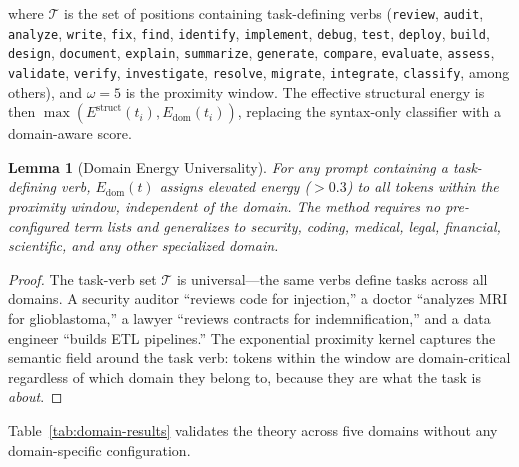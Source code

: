 \documentclass[11pt]{article}
\newtheorem{lemma}[theorem]{Lemma}
\theoremstyle{remark}
\newcommand{\Er}{E^{\text{struct}}}
\begin{document}
where $\mathcal{T}$ is the set of positions containing task-defining verbs
(\texttt{review}, \texttt{audit}, \texttt{analyze}, \texttt{write},
\texttt{fix}, \texttt{find}, \texttt{identify}, \texttt{implement},
\texttt{debug}, \texttt{test}, \texttt{deploy}, \texttt{build},
\texttt{design}, \texttt{document}, \texttt{explain}, \texttt{summarize},
\texttt{generate}, \texttt{compare}, \texttt{evaluate}, \texttt{assess},
\texttt{validate}, \texttt{verify}, \texttt{investigate}, \texttt{resolve},
\texttt{migrate}, \texttt{integrate}, \texttt{classify}, among others),
and $\omega = 5$ is the proximity window. The effective structural
energy is then $\max(\Er(t_i), E_{\text{dom}}(t_i))$, replacing the
syntax-only classifier with a domain-aware score.

\begin{lemma}[Domain Energy Universality]
\label{lem:domain-energy}
For any prompt containing a task-defining verb, $E_{\text{dom}}(t)$ assigns
elevated energy ($> 0.3$) to all tokens within the proximity window,
independent of the domain. The method requires no pre-configured term
lists and generalizes to security, coding, medical, legal, financial,
scientific, and any other specialized domain.
\end{lemma}

\begin{proof}
The task-verb set $\mathcal{T}$ is universal---the same verbs define tasks
across all domains. A security auditor ``reviews code for injection,''
a doctor ``analyzes MRI for glioblastoma,'' a lawyer ``reviews contracts
for indemnification,'' and a data engineer ``builds ETL pipelines.''
The exponential proximity kernel captures the semantic field around the
task verb: tokens within the window are domain-critical regardless of
which domain they belong to, because they are what the task is \emph{about}.
\end{proof}

Table~\ref{tab:domain-results} validates the theory across five domains
without any domain-specific configuration.
\end{document}
